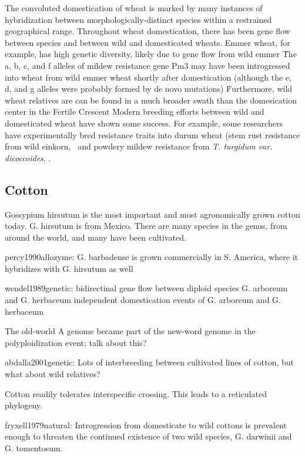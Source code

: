 \documentclass[11pt]{article}
\begin{document}
The convoluted domestication of wheat is marked by many instances of hybridization between morphologically-distinct species within a restrained geographical range.
Throughout wheat domestication, there has been gene flow between species and between wild and domesticated wheats.
Emmer wheat, for example, has high genetic diversity, likely due to gene flow from wild emmer \cite{luo2007structure, dvorak2006molecular}\.
The a, b, c, and f alleles of mildew resistance gene Pm3 may have been introgressed into wheat from wild emmer wheat shortly after domestication (although the e, d, and g alleles were probably formed by de novo mutations) \cite{TPJ:TPJ2772}\.
Furthermore, wild wheat relatives are can be found in a much broader swath than the domesication center in the Fertile Crescent \cite{CWR}\.
Modern breeding efforts between wild and domesticated wheat have shown some success.
For example, some researchers have experimentally bred resistance traits into durum wheat (stem rust resistance from wild einkorn, \cite{gerechter1971transfer}\, and powdery mildew resistance from \emph{T. turgidum var. dicoccoides}, \cite{blanco2008molecular}.








\subsection*{Cotton}

Gossypium hirsutum is the most important and most agronomically grown cotton today.
G. hirsutum is from Mexico.
There are many species in the genus, from around the world, and many have been cultivated.

percy1990allozyme:
G. barbadense is grown commercially in S. America, where it hybridizes with G. hirsutum as well

wendel1989genetic:
bidirectinal gene flow between diploid species G. arboreum and G. herbaceum
independent domestication events of G. arboreum and G. herbaceum

The old-world A genome became part of the new-word genome in the polyploidization event; talk about this?

abdalla2001genetic:
Lots of interbreeding between cultivated lines of cotton, but what about wild relatives?

Cotton readily tolerates interspecific crossing.
This leads to a reticulated phylogeny.

fryxell1979natural:
Introgression from domesticate to wild cottons is prevalent enough to threaten the continued existence of two wild species, G. darwinii and G. tomentosum.
\end{document}

